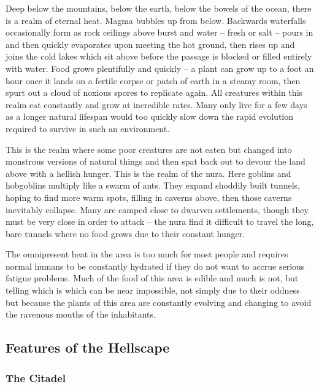 \begin{multicols}{2}

\noindent
Deep below the mountains, below the earth, below the bowels of the ocean, there is a realm of eternal heat.
Magma bubbles up from below.
Backwards waterfalls occasionally form as rock ceilings above burst and water -- fresh or salt -- pours in and then quickly evaporates upon meeting the hot ground, then rises up and joins the cold lakes which sit above before the passage is blocked or filled entirely with water.
Food grows plentifully and quickly -- a plant can grow up to a foot an hour once it lands on a fertile corpse or patch of earth in a steamy room, then spurt out a cloud of noxious spores to replicate again.
All creatures within this realm eat constantly and grow at incredible rates.
Many only live for a few days as a longer natural lifespan would too quickly slow down the rapid evolution required to survive in such an environment.

  This is the realm where some poor creatures are not eaten but changed into monstrous versions of natural things and then spat back out to devour the land above with a hellish hunger.  This is the realm of the nura.  Here goblins and hobgoblins multiply like a swarm of ants.  They expand shoddily built tunnels, hoping to find more warm spots, filling in caverns above, then those caverns inevitably collapse.  Many are camped close to dwarven settlements, though they must be very close in order to attack -- the nura find it difficult to travel the long, bare tunnels where no food grows due to their constant hunger.

  The omnipresent heat in the area is too much for most people and requires normal humans to be constantly hydrated if they do not want to accrue serious fatigue problems.  Much of the food of this area is edible and much is not, but telling which is which can be near impossible, not simply due to their oddness but because the plants of this area are constantly evolving and changing to avoid the ravenous mouths of the inhabitants.

\subsection{Features of the Hellscape}

\subsubsection{The Citadel}


\end{multicols}
